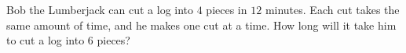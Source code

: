 Bob the Lumberjack can cut a log into $4$ pieces in $12$ minutes. Each cut takes the same amount of time, and he makes one cut at a time. How long will it take him to cut a log into $6$ pieces?
